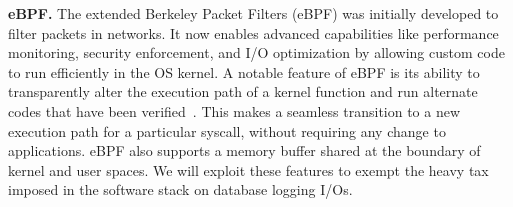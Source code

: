 {\bf eBPF.}
The extended Berkeley Packet Filters (eBPF) \cite{ebpf} was initially developed to filter packets in networks. It now enables advanced capabilities like performance monitoring, security enforcement, and I/O optimization by allowing custom code to run efficiently in the OS kernel.
A notable feature of eBPF is its ability to transparently alter the execution path of a kernel function and run alternate codes that have been verified~\cite{ebpf,280870}.
This makes a seamless transition to a new execution path for a particular syscall, without requiring any change to applications.
eBPF also supports a memory buffer shared at the boundary of kernel and user spaces.
We will exploit these features to exempt the heavy tax imposed in the software stack on database logging I/Os.

